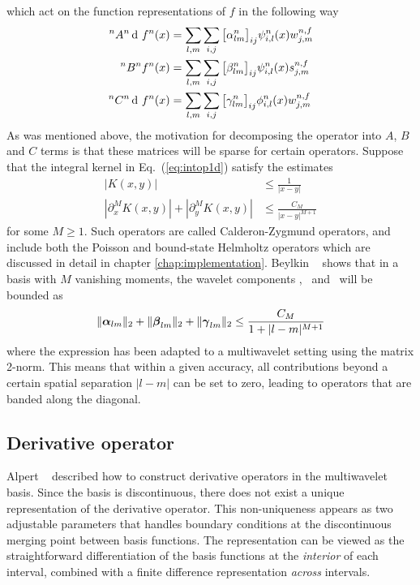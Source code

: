 which act on the function representations of $f$ in the following way
\begin{align}
    \label{eq:Aact}
    \A{n}{n}\waveletrep{f}{n}(x) &= \sum_{l,m} \sum_{i,j}
	\big[\alpha^n_{lm}\big]_{ij}
        \wavelet^n_{i,l}(x) 
	\waveletcoef^{n,f}_{j,m}\\
    \label{eq:Bact}
    \B{n}{n}\scalingrep{f}{n}(x) &= \sum_{l,m} \sum_{i,j}
	\big[\beta^n_{lm}\big]_{ij}
        \wavelet^n_{i,l}(x) 
	\scalingcoef^{n,f}_{j,m}\\
    \label{eq:Cact}
    \C{n}{n}\waveletrep{f}{n}(x) &= \sum_{l,m} \sum_{i,j}
	\big[\gamma^n_{lm}\big]_{ij}
        \scaling^n_{i,l}(x) 
	\waveletcoef^{n,f}_{j,m}
\end{align}
As was mentioned above, the motivation for decomposing the operator into $A$, $B$
and $C$ terms is that these matrices will be sparse for certain operators. Suppose 
that the integral kernel in Eq.~(\ref{eq:intop1d}) satisfy the estimates
\begin{align}
    |K(x,y)| &\leq \frac{1}{|x-y|}\\
    |\partial_x^M K(x,y)|+ |\partial_y^M K(x,y)| &\leq \frac{C_M}{|x-y|^{M+1}}
\end{align}
for some $M\geq1$. Such operators are called Calderon-Zygmund operators, and
include both the Poisson and bound-state Helmholtz operators which are discussed 
in detail in chapter \ref{chap:implementation}. Beylkin \etal~\cite{Beylkin:1991} 
shows that in a basis with $M$ vanishing moments, the wavelet 
components \alphamat, \betamat\ and \gammamat\ will be bounded as
\begin{equation}
    \label{eq:operbandwidth}
    \|\boldsymbol{\alpha}_{lm}\|_2 + \|\boldsymbol{\beta}_{lm}\|_2 + \|\boldsymbol{\gamma}_{lm}\|_2 
	\leq \frac{C_M}{1+|l-m|^{M+1}}
\end{equation}
where the expression has been adapted to a multiwavelet setting using the matrix
2-norm. This means that within a given accuracy, all contributions beyond a certain 
spatial separation $|l-m|$ can be set to zero, leading to operators that are 
banded along the diagonal.

\subsection{Derivative operator}\label{sec:diff_oper}
Alpert \etal~\cite{Alpert:2002p149} described how to construct derivative operators in
the multiwavelet basis. Since the basis is discontinuous, there does not exist a
unique representation of the derivative operator. This non-uniqueness
appears as two adjustable parameters that handles boundary conditions at the
discontinuous merging point between basis functions. The representation can be
viewed as the straightforward differentiation of the basis functions at the 
\emph{interior} of each interval, combined with a finite difference representation
\emph{across} intervals.

